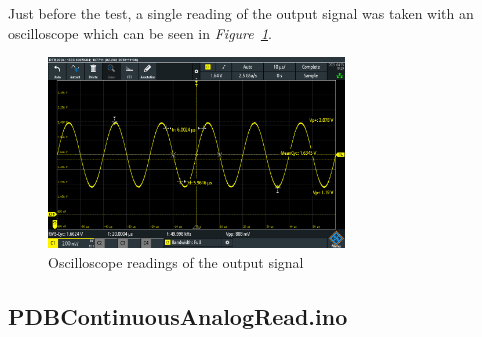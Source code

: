 \vspace{4cm}

Just before the test, a single reading of the output signal was taken with an oscilloscope which can be seen in \textit{Figure~\ref{fig:ContAnalOscillascope}}.

\begin{figure}[h]
    \centering
    \includegraphics[width=0.70\textwidth]{graphics/ContAnalogReadOscillascope.PNG}
    \caption{Oscilloscope readings of the output signal}
    \label{fig:ContAnalOscillascope}
\end{figure}



\subsection{PDBContinuousAnalogRead.ino}


